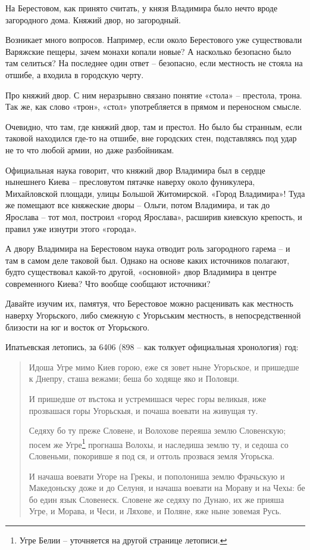 \documentclass[a5paper,11pt,openany]{article}
\begin{document}
На Берестовом, как принято считать, у князя Владимира было нечто вроде загородного дома. Княжий двор, но загородный. %

Возникает много вопросов. Например, если около Берестового уже существовали Варяжские пещеры, зачем монахи копали новые? А насколько безопасно было там селиться? На последнее один ответ – безопасно, если местность не стояла на отшибе, а входила в городскую черту.


Про княжий двор. С ним неразрывно связано понятие «стола» – престола, трона. Так же, как слово «трон», «стол» употребляется в прямом и переносном смысле.

Очевидно, что там, где княжий двор, там и престол. Но было бы странным, если таковой находился где-то на отшибе, вне городских стен, подставляясь под удар не то что любой армии, но даже разбойникам. 
 
Официальная наука говорит, что княжий двор Владимира был в сердце нынешнего Киева – пресловутом пятачке наверху около фуникулера, Михайловской площади, улицы Большой Житомирской. «Город Владимира»! Туда же помещают все княжеские дворы – Ольги, потом Владимира, и так до Ярослава – тот мол, построил «город Ярослава», расширив киевскую крепость, и правил уже изнутри этого «города».

А двору Владимира на Берестовом наука отводит роль загородного гарема – и там в самом деле таковой был. Однако на основе каких источников полагают, будто существовал какой-то другой, «основной» двор Владимира в центре современного Киева? Что вообще сообщают источники?

Давайте изучим их, памятуя, что Берестовое можно расценивать как местность наверху Угорьского, либо смежную с Угорьським местность, в непосредственной близости на юг и восток от Угорьского.

Ипатьевская летопись, за 6406 (898 – как толкует официальная хронология) год:

\begin{quotation}
\noindent Идоша Угре мимо Киев горою, еже ся зовет ныне Угорьское, и пришедше к Днепру, сташа вежами; беша бо ходяще яко и Половци.

И пришедше от въстока и устремишася черес горы великыя, иже прозвашася горы Угорьскыя, и почаша воевати на живущая ту. 

Седяху бо ту преже Словене, и Волохове переяша землю Словенскую; посем же Угре\footnote{Угре Белии – уточняется на другой странице летописи.} прогнаша Волохы, и наследиша землю ту, и седоша со Словеньми, покоривше я под ся, и оттоль прозвася земля Угорьска.

И начаша воевати Угоре на Грекы, и пополониша землю Фрачьскую и Македоньску доже и до Селуня, и начаша воевати на Мораву и на Чехы: бе бо един язык Словенеск. Словене же седяху по Дунаю, их же прияша Угре, и Морава, и Чеси, и Ляхове, и Поляне, яже ныне зовемая Русь.
\end{quotation}
\end{document}
